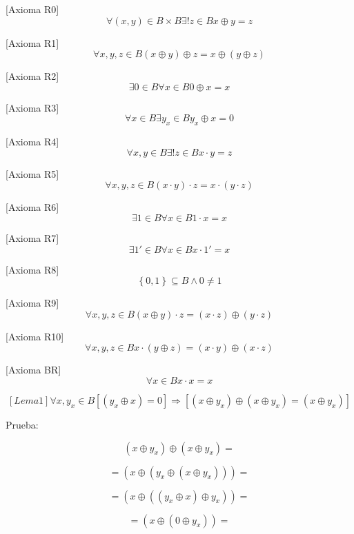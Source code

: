 \begin{enumerate}
\begin{enumerate}
\begin{enumerate}
      {[}Axioma R0{]}\emph{
      }\[\forall{\left( {x,y} \right) \in {B \times B}}\exists\mathtt{\mathrm{!}}{z \in B}x \oplus {y = z}\]

      {[}Axioma R1{]}
      \[\forall x,y,{z \in B}\left( {x \oplus y} \right) \oplus {z = x} \oplus \left( {y \oplus z} \right)\]

      {[}Axioma R2{]}
      \[\exists{0 \in B}\forall{x \in B}0 \oplus {x = x}\]

      {[}Axioma R3{]}
      \[\forall{x \in B}\exists{y_{x} \in B}y_{x} \oplus {x = 0}\]

      {[}Axioma R4{]}
      \[\forall x,{y \in B}\exists\mathtt{\mathrm{!}}{z \in B}{{x \cdot y} = z}\]

      {[}Axioma R5{]}
      \[\forall x,y,{z \in B}{{\left( {x \cdot y} \right) \cdot z} = {x \cdot \left( {y \cdot z} \right)}}\]

      {[}Axioma R6{]}
      \[\exists{1 \in B}\forall{x \in B}{{1 \cdot x} = x}\]

      {[}Axioma R7{]}
      \[\exists 1{' \in B}\forall{x \in B}{x \cdot 1}{' = x}\]

      {[}Axioma R8{]}
      \[{\left\{ 0,1 \right\} \subseteq {B \land 0}} \neq 1\]

      {[}Axioma R9{]}
      \[\forall x,y,{z \in B}{{\left( {x \oplus y} \right) \cdot z} = \left( {x \cdot z} \right)} \oplus \left( {y \cdot z} \right)\]

      {[}Axioma
      R10{]}\[\forall x,y,{z \in B}{{x \cdot \left( {y \oplus z} \right)} = \left( {x \cdot y} \right)} \oplus \left( {x \cdot z} \right)\]

      {[}Axioma BR{]}\[\forall{x \in B}{{x \cdot x} = x}\]

      \[\left\lbrack {{Lema}1} \right\rbrack\forall x,{y_{x} \in B}{}{}{}\left\lbrack {\left( {y_{x} \oplus x} \right) = 0} \right\rbrack\Rightarrow\left\lbrack {\left( {x \oplus y_{x}} \right) \oplus {\left( {x \oplus y_{x}} \right) = \left( {x \oplus y_{x}} \right)}} \right\rbrack\]

      Prueba:

      \[\left( {x \oplus y_{x}} \right) \oplus {\left( {x \oplus y_{x}} \right) =}\]

      \[{= \left( {x \oplus \left( {y_{x} \oplus \left( {x \oplus y_{x}} \right)} \right)} \right)} =\]

      \[{= \left( {x \oplus \left( {\left( {y_{x} \oplus x} \right) \oplus y_{x}} \right)} \right)} =\]

      \[{= \left( {x \oplus \left( {0 \oplus y_{x}} \right)} \right)} =\]


\end{enumerate}
\end{enumerate}
\end{enumerate}
